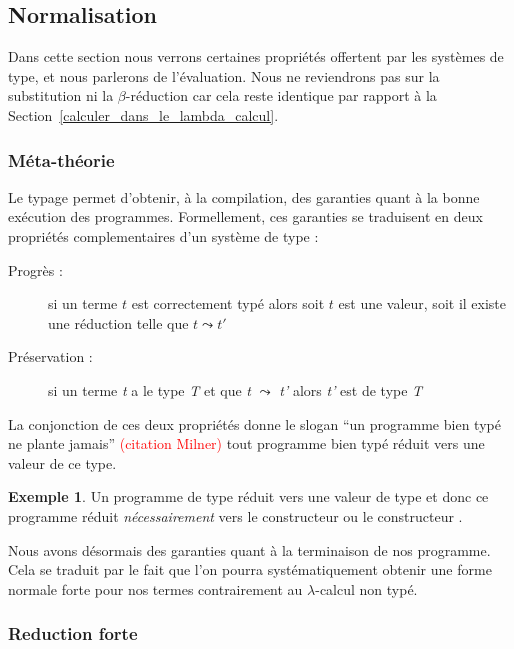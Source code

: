 \documentclass {article}
\theoremstyle{definition}
\newtheorem{example}{Exemple}
\theoremstyle{remark}
\newcommand{\todo}[1]{\textcolor{red}{#1}}
\begin{document}
\subsection{Normalisation} %

Dans cette section nous verrons certaines propriétés offertent par les systèmes de type, et nous parlerons 
de l'évaluation. Nous ne reviendrons pas sur la substitution ni la $\beta$-réduction car cela reste identique par 
rapport à la Section~\ref{calculer_dans_le_lambda_calcul}.

\subsubsection{Méta-théorie}

Le typage permet d'obtenir, à la compilation, des garanties quant à la
bonne exécution des programmes.  Formellement, ces garanties se traduisent en deux propriétés complementaires d'un système de type :
\begin{description}
\item[Progrès :] si un terme \(t\) est correctement typé alors soit \(t\) est une valeur, soit il
 existe une réduction telle que \(t \leadsto t'\)
\item[Préservation :] si un terme \emph{t} a le type \emph{T}
et que \emph{t} $\leadsto$ \emph{t'} alors \emph{t'} est de type \emph{T}
\end{description}

La conjonction de ces deux propriétés donne le slogan ``un programme
bien typé ne plante jamais'' \todo{(citation Milner)} tout programme
bien typé réduit vers une valeur de ce type.

\begin{example}
  Un programme de type \bool{} réduit vers une valeur de type \bool{}
  et donc ce programme réduit \emph{nécessairement} vers le
  constructeur \true{} ou le constructeur \false{}.
\end{example}

Nous avons désormais des garanties quant à la terminaison de nos programme.
Cela se traduit par le fait que l'on pourra systématiquement obtenir une 
forme normale forte pour nos termes contrairement au \(\lambda\)-calcul non typé.


\subsubsection{Reduction forte}
\end{document}
